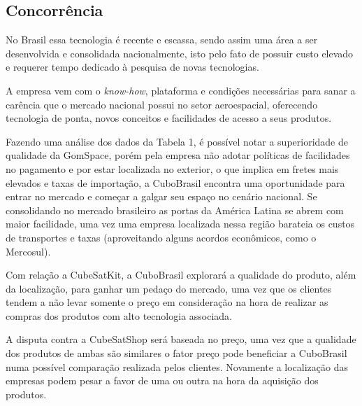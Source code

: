 \documentclass[
	12pt,				%
	openright,			%
	oneside,			%
	a4paper,			%
	english,			%
	french,				%
	spanish,			%
	brazil				%
	]{abntex2}
\begin{document}
\subsection[Concorrência]{Concorrência}

	No Brasil essa tecnologia é recente e escassa, sendo assim uma área a ser desenvolvida e consolidada nacionalmente, isto pelo fato de possuir custo elevado e requerer tempo dedicado à pesquisa de novas tecnologias.
	
	A empresa vem com o \textit{know-how}, plataforma e condições necessárias para sanar a carência que o mercado nacional possui no setor aeroespacial, oferecendo tecnologia de ponta, novos conceitos e facilidades de acesso a seus produtos.
	
	Fazendo uma análise dos dados da Tabela 1, é possível notar a superioridade de qualidade da GomSpace, porém pela empresa não adotar políticas de facilidades no pagamento e por estar localizada no exterior, o que implica em fretes mais elevados e taxas de importação, a CuboBrasil encontra uma oportunidade para entrar no mercado e começar a galgar seu espaço no cenário nacional. Se consolidando no mercado brasileiro as portas da América Latina se abrem com maior facilidade, uma vez uma empresa localizada nessa região barateia os custos de transportes e taxas (aproveitando alguns acordos econômicos, como o Mercosul). 
	
	Com relação a CubeSatKit, a CuboBrasil explorará a qualidade do produto, além da localização, para ganhar um pedaço do mercado, uma vez que os clientes tendem a não levar somente o preço em consideração na hora de realizar as compras dos produtos com alto tecnologia associada.
	
	A disputa contra a CubeSatShop será baseada no preço, uma vez que a qualidade dos produtos de ambas são similares o fator preço pode beneficiar a CuboBrasil numa possível comparação realizada pelos clientes. Novamente a localização das empresas podem pesar a favor de uma ou outra na hora da aquisição dos produtos.
	
\end{document}
